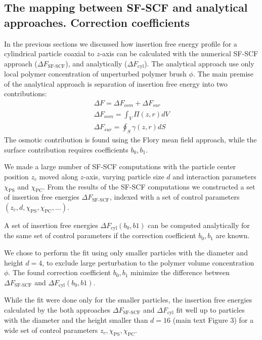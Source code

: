 \documentclass[12pt, a4paper]{article}
\begin{document}
\subsection*{The mapping between SF-SCF and analytical approaches. Correction coefficients}
In the previous sections we discussed how insertion free energy profile for a cylindrical particle coaxial to $z$-axis can be calculated with the numerical SF-SCF approach ($\Delta F_{\textrm{SF-SCF}}$), and analytically ($\Delta F_{\textrm{cyl}}$).
The analytical approach use only local polymer concentration of unperturbed polymer brush $\phi$.
The main premise of the analytical approach is separation of insertion free energy into two contributions:
\begin{eqnarray}
    \Delta F = \Delta F_{osm} + \Delta F_{sur}
    \\
    \Delta F_{osm} = \int_{V} \Pi(z,r) dV
    \\
    \Delta F_{sur} = \oint_{S} \gamma (z,r) dS
\label{Delta_F}
\end{eqnarray}
The osmotic contribution is found using the Flory mean field approach, while the surface contribution requires coefficients $b_0, b_1$.

We made a large number of SF-SCF computations with the particle center position $z_{c}$ moved along $z$-axis, varying particle size $d$ and interaction parameters $\chi_{\textrm{PS}}$ and $\chi_{\textrm{PC}}$. 
From the results of the SF-SCF computations we constructed a set of insertion free energies $\Delta F_{\textrm{SF-SCF}}$, indexed with a set of control parameters $(z_c, d, \chi_{\textrm{PS}}, \chi_{\textrm{PC}}, \dots)$. 

A set of insertion free energies $\Delta F_{\textrm{cyl}}(b_0, b1)$ can be computed analytically for the same set of control parameters if the correction coefficient $b_0, b_1$ are known.

We chose to perform the fit using only smaller particles with the diameter and height $d=4$, to exclude large perturbation to the polymer volume concentration $\phi$. The found correction coefficient $b_0, b_1$ minimize the difference between $\Delta F_{\textrm{SF-SCF}}$ and $\Delta F_{\textrm{cyl}}(b_0, b1)$.

While the fit were done only for the smaller particles, the insertion free energies calculated by the both approaches $\Delta F_{\textrm{SF-SCF}}$ and $\Delta F_{\textrm{cyl}}$ fit well up to particles with the diameter and the height smaller than $d=16$ (main text Figure 3) for a wide set of control parameters $z_c, \chi_{\textrm{PS}}, \chi_{\textrm{PC}}$.
\end{document}
